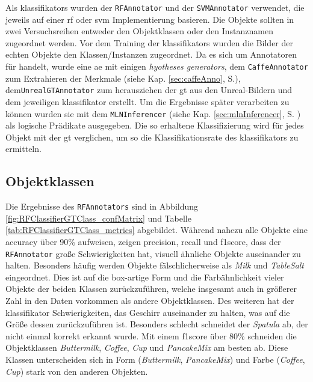 Als \glspl{klassifikator} wurden der \texttt{RFAnnotator} und der \texttt{SVMAnnotator} verwendet, die jeweils auf einer \gls{rf} oder \gls{svm} Implementierung basieren. Die Objekte sollten in zwei Versuchsreihen entweder den Objektklassen oder den Instanznamen zugeordnet werden. Vor dem Training der \glspl{klassifikator} wurden die Bilder der echten Objekte den Klassen/Instanzen zugeordnet. Da es sich um Annotatoren für \robosherlock handelt, wurde eine \gls{ae} mit einigen \textit{hyotheses generators}, dem \texttt{CaffeAnnotator} zum Extrahieren der Merkmale (siehe Kap. \ref{sec:caffeAnno}, S.\pageref{sec:caffeAnno}), dem\linebreak \texttt{UnrealGTAnnotator} zum herausziehen der \gls{gt} aus den Unreal-Bildern und dem jeweiligen \gls{klassifikator} erstellt. Um die Ergebnisse später verarbeiten zu können wurden sie mit dem \texttt{MLNInferencer} (siehe Kap. \ref{sec:mlnInferencer}, S. \pageref{sec:mlnInferencer}) als logische Prädikate ausgegeben. Die so erhaltene Klassifizierung wird für jedes Objekt mit der \gls{gt} verglichen, um so die Klassifikationsrate des \gls{klassifikator}s zu ermitteln.


\subsection{Objektklassen}
Die Ergebnisse des \texttt{RFAnnotators} sind in Abbildung \ref{fig:RFClassifierGTClass_confMatrix} und Tabelle \ref{tab:RFClassifierGTClass_metrics} abgebildet. Während nahezu alle Objekte eine \gls{accuracy} über 90\% aufweisen, zeigen \gls{precision}, \gls{recall} und \gls{f1score}, dass der \texttt{RFAnnotator} große Schwierigkeiten hat, visuell ähnliche Objekte auseinander zu halten. Besonders häufig werden Objekte fälschlicherweise als \textit{Milk} und \textit{TableSalt} eingeordnet. Dies ist auf die box-artige Form und die Farbähnlichkeit vieler Objekte der beiden Klassen zurückzuführen, welche insgesamt auch in größerer Zahl in den Daten vorkommen als andere Objektklassen. Des weiteren hat der \gls{klassifikator} Schwierigkeiten, das Geschirr auseinander zu halten, was auf die Größe dessen zurückzuführen ist. Besonders schlecht schneidet der \textit{Spatula} ab, der nicht einmal korrekt erkannt wurde. Mit einem \gls{f1score} über 80\% schneiden die Objektklassen \textit{Buttermilk}, \textit{Coffee}, \textit{Cup} und \textit{PancakeMix} am besten ab. Diese Klassen unterscheiden sich in Form (\textit{Buttermilk}, \textit{PancakeMix}) und Farbe (\textit{Coffee}, \textit{Cup}) stark von den anderen Objekten.  \par

